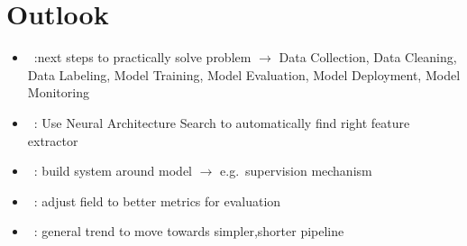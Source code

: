 \section{Outlook}

\begin{itemize}
    \item~\cite{watanabe_preliminary_2019}:next steps to practically solve problem
        $\rightarrow$  Data Collection, Data Cleaning, Data Labeling, Model Training,
        Model Evaluation, Model Deployment, Model Monitoring
    \item~\cite{zhao_improving_2020}: Use Neural Architecture Search to automatically find right
        feature extractor
    \item~\cite{siebert_construction_2021,nakamichi_requirements-driven_2020}: build system around
        model $\rightarrow$ e.g.\ supervision mechanism
    \item~\cite{shi_icdar2017_2017,he_icpr2018_2018}: adjust field to better metrics for evaluation
    \item~\cite{long_scene_2021}: general trend to move towards simpler,shorter pipeline
\end{itemize}

